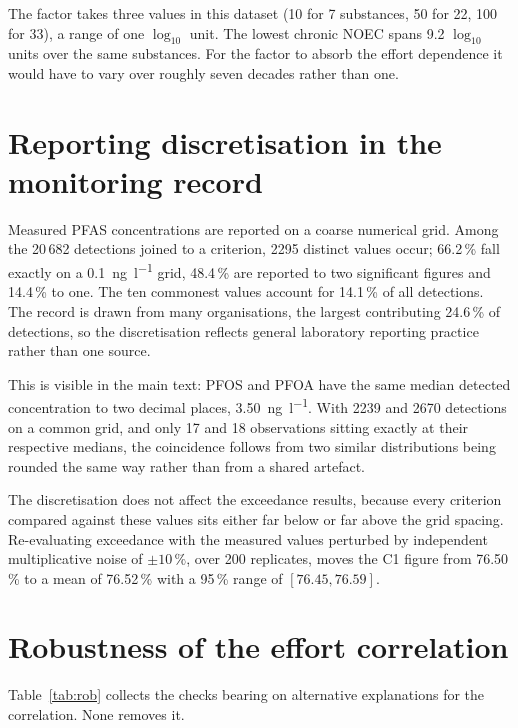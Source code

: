 \documentclass[preprint,11pt]{elsarticle}
\begin{document}
The factor takes three values in this dataset (10 for 7 substances, 50 for 22,
100 for 33), a range of one $\log_{10}$ unit. The lowest chronic \textsf{NOEC}
spans 9.2 $\log_{10}$ units over the same substances. For the factor to absorb
the effort dependence it would have to vary over roughly seven decades rather
than one.

\section{Reporting discretisation in the monitoring record}

Measured PFAS concentrations are reported on a coarse numerical grid. Among the
20\,682 detections joined to a criterion, 2295 distinct values occur; 66.2\,\%
fall exactly on a \SI{0.1}{\nano\gram\per\litre} grid, 48.4\,\% are reported to
two significant figures and 14.4\,\% to one. The ten commonest values account
for 14.1\,\% of all detections. The record is drawn from many organisations, the
largest contributing 24.6\,\% of detections, so the discretisation reflects
general laboratory reporting practice rather than one source.

This is visible in the main text: PFOS and PFOA have the same median detected
concentration to two decimal places, \SI{3.50}{\nano\gram\per\litre}. With 2239
and 2670 detections on a common grid, and only 17 and 18 observations sitting
exactly at their respective medians, the coincidence follows from two similar
distributions being rounded the same way rather than from a shared artefact.

The discretisation does not affect the exceedance results, because every
criterion compared against these values sits either far below or far above the
grid spacing. Re-evaluating exceedance with the measured values perturbed by
independent multiplicative noise of $\pm 10\,\%$, over 200 replicates, moves the
C1 figure from 76.50\,\% to a mean of 76.52\,\% with a 95\,\% range of
$[76.45, 76.59]$.

\clearpage
\section{Robustness of the effort correlation}

Table~\ref{tab:rob} collects the checks bearing on alternative explanations for
the correlation. None removes it.
\end{document}
